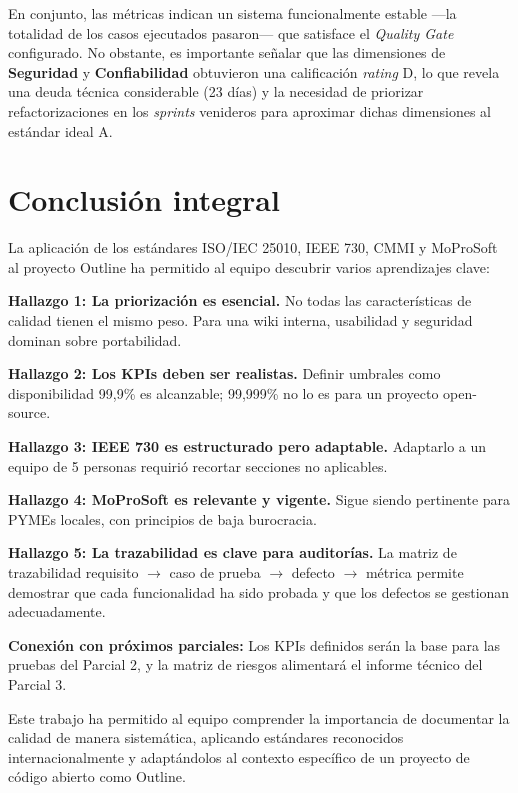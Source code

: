 \documentclass[12pt, letterpaper]{article}
\begin{document}
En conjunto, las métricas indican un sistema funcionalmente estable —la totalidad de los casos ejecutados pasaron— que satisface el \textit{Quality Gate} configurado. No obstante, es importante señalar que las dimensiones de \textbf{Seguridad} y \textbf{Confiabilidad} obtuvieron una calificación \textit{rating} D, lo que revela una deuda técnica considerable (23 días) y la necesidad de priorizar refactorizaciones en los \textit{sprints} venideros para aproximar dichas dimensiones al estándar ideal A.

\section{Conclusión integral}

La aplicación de los estándares ISO/IEC 25010, IEEE 730, CMMI y MoProSoft al proyecto Outline ha permitido al equipo descubrir varios aprendizajes clave:

\textbf{Hallazgo 1: La priorización es esencial.} No todas las características de calidad tienen el mismo peso. Para una wiki interna, usabilidad y seguridad dominan sobre portabilidad.

\textbf{Hallazgo 2: Los KPIs deben ser realistas.} Definir umbrales como disponibilidad 99,9\% es alcanzable; 99,999\% no lo es para un proyecto open-source.

\textbf{Hallazgo 3: IEEE 730 es estructurado pero adaptable.} Adaptarlo a un equipo de 5 personas requirió recortar secciones no aplicables.

\textbf{Hallazgo 4: MoProSoft es relevante y vigente.} Sigue siendo pertinente para PYMEs locales, con principios de baja burocracia.

\textbf{Hallazgo 5: La trazabilidad es clave para auditorías.} La matriz de trazabilidad requisito $\to$ caso de prueba $\to$ defecto $\to$ métrica permite demostrar que cada funcionalidad ha sido probada y que los defectos se gestionan adecuadamente.

\textbf{Conexión con próximos parciales:} Los KPIs definidos serán la base para las pruebas del Parcial 2, y la matriz de riesgos alimentará el informe técnico del Parcial 3.

Este trabajo ha permitido al equipo comprender la importancia de documentar la calidad de manera sistemática, aplicando estándares reconocidos internacionalmente y adaptándolos al contexto específico de un proyecto de código abierto como Outline.
\end{document}
